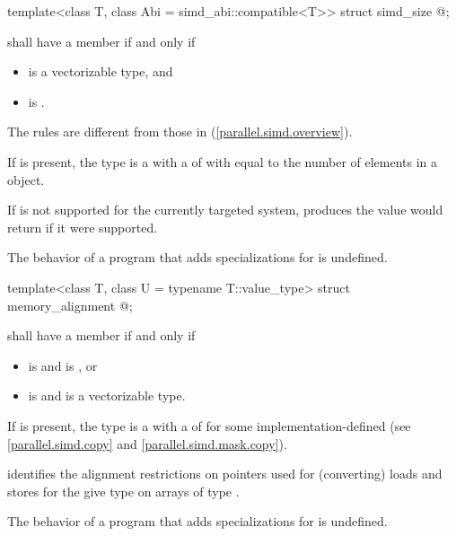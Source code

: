 \begin{itemdecl}
template<class T, class Abi = simd_abi::compatible<T>> struct simd_size { @\seebelow@ };
\end{itemdecl}

\begin{itemdescr}
\pnum
{} shall have a member  if and only if
\begin{itemize}
  \item {} is a vectorizable type, and
  \item {} is .
\end{itemize}
\begin{note}
  The rules are different from those in (\ref{parallel.simd.overview}).
\end{note}

\pnum
If  is present, the type  is a  with a  of  with  equal to the number of elements in a  object. \begin{note}If  is not supported for the currently targeted system,  produces the value  would return if it were supported.\end{note}

\pnum
The behavior of a program that adds specializations for  is undefined.
\end{itemdescr}

\begin{itemdecl}
template<class T, class U = typename T::value_type> struct memory_alignment { @\seebelow@ };
\end{itemdecl}

\begin{itemdescr}
\pnum
{} shall have a member  if and only if
\begin{itemize}
  \item {} is  and  is , or
  \item {} is  and  is a vectorizable type.
\end{itemize}

\pnum
If  is present, the type  is a  with a  of  for some implementation-defined  (see \ref{parallel.simd.copy} and \ref{parallel.simd.mask.copy}). \begin{note} identifies the alignment restrictions on pointers used for (converting) loads and stores for the give type  on arrays of type .\end{note}

\pnum
The behavior of a program that adds specializations for  is undefined.
\end{itemdescr}

